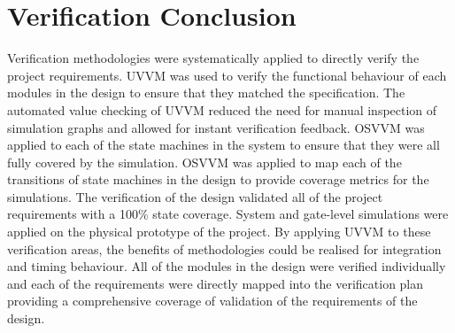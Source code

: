 




\section{Verification Conclusion}

Verification methodologies were systematically applied to directly verify the project requirements. UVVM was used to verify the functional behaviour of each modules in the design to ensure that they matched the specification. The automated value checking of UVVM reduced the need for manual inspection of simulation graphs and allowed for instant verification feedback. OSVVM was applied to each of the state machines in the system to ensure that they were all fully covered by the simulation. OSVVM was applied to map each of the transitions of state machines in the design to provide coverage metrics for the simulations. The verification of the design validated all of the project requirements with a 100\% state coverage. System and gate-level simulations were applied on the physical prototype of the project. By applying UVVM to these verification areas, the benefits of methodologies could be realised for integration and timing behaviour. All of the modules in the design were verified individually and each of the requirements were directly mapped into the verification plan providing a comprehensive coverage of validation of the requirements of the design.  